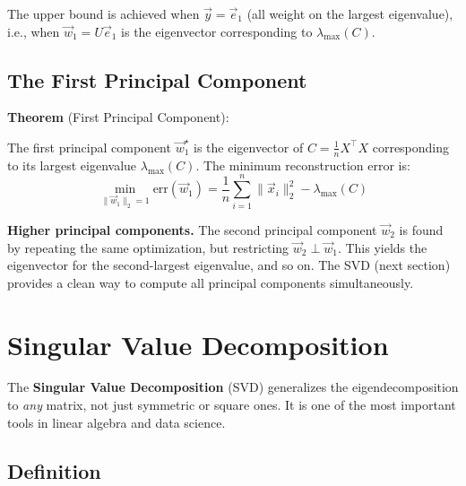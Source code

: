 \documentclass[10pt, twocolumn]{article}
\theoremstyle{definition}
\theoremstyle{plain}
\begin{document}
The upper bound is achieved when $\vec{y} = \vec{e}_1$ (all weight on the largest eigenvalue), i.e., when $\vec{w}_1 = U\vec{e}_1$ is the eigenvector corresponding to $\lambda_{\max}(C)$.

\subsection{The First Principal Component}

\begin{tcolorbox}
\textbf{Theorem} (First Principal Component):

The first principal component $\vec{w}_1^\star$ is the eigenvector of $C = \frac{1}{n}X^\top X$ corresponding to its largest eigenvalue $\lambda_{\max}(C)$. The minimum reconstruction error is:
\[
    \min_{\|\vec{w}_1\|_2 = 1} \text{err}(\vec{w}_1) = \frac{1}{n} \sum_{i=1}^{n} \|\vec{x}_i\|_2^2 - \lambda_{\max}(C)
\]
\end{tcolorbox}

\begin{tcolorbox}[colframe=black!50]
\textbf{Higher principal components.} The second principal component $\vec{w}_2$ is found by repeating the same optimization, but restricting $\vec{w}_2 \perp \vec{w}_1$. This yields the eigenvector for the second-largest eigenvalue, and so on. The SVD (next section) provides a clean way to compute all principal components simultaneously.
\end{tcolorbox}

\section{Singular Value Decomposition}

The \textbf{Singular Value Decomposition} (SVD) generalizes the eigendecomposition to \emph{any} matrix, not just symmetric or square ones. It is one of the most important tools in linear algebra and data science.

\subsection{Definition}
\end{document}
